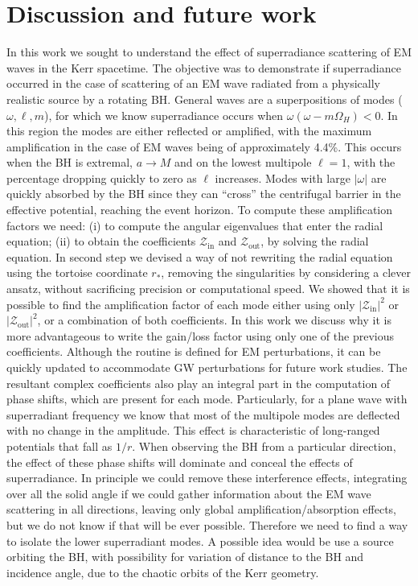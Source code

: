 
\chapter{Discussion and future work} %
\label{Chapter6}

In this work we sought to understand the effect of superradiance scattering of EM waves in the Kerr spacetime.
The objective was to demonstrate if superradiance occurred in the case of scattering of an EM wave radiated from a physically realistic source by a rotating BH.
General waves are a superpositions of modes ($\omega, \ell, m$), for which we know superradiance occurs when $\omega(\omega - m \Omega_H)<0$.
In this region the modes are either reflected or amplified, with the maximum amplification in the case of EM waves being of approximately 4.4\%.
This occurs when the BH is extremal, $a\to M$ and on the lowest multipole $\ell=1$, with the percentage dropping quickly to zero as $\ell$ increases.
Modes with large $|\omega|$ are quickly absorbed by the BH since they can ``cross'' the centrifugal barrier in the effective potential, reaching the event horizon.
To compute these amplification factors we need: (i) to compute the angular eigenvalues that enter the radial equation; (ii) to obtain the coefficients $\mathscr{Z}_\mathrm{in}$ and $\mathscr{Z}_\mathrm{out}$, by solving the radial equation.
In second step we devised a way of not rewriting the radial equation using the tortoise coordinate $r_*$, removing the singularities by considering a clever ansatz, without sacrificing precision or computational speed.
We showed that it is possible to find the amplification factor of each mode either using only $|\mathscr{Z}_\mathrm{in}|^2$ or $|\mathscr{Z}_\mathrm{out}|^2$, or a combination of both coefficients.
In this work we discuss why it is more advantageous to write the gain/loss factor using only one of the previous coefficients.
Although the routine is defined for EM perturbations, it can be quickly updated to accommodate GW perturbations for future work studies.
The resultant complex coefficients also play an integral part in the computation of phase shifts, which are present for each mode.
Particularly, for a plane wave with superradiant frequency we know that most of the multipole modes are deflected with no change in the amplitude.
This effect is characteristic of long-ranged potentials that fall as $1/r$.
When observing the BH from a particular direction, the effect of these phase shifts will dominate and conceal the effects of superradiance.
In principle we could remove these interference effects, integrating over all the solid angle if we could gather information about the EM wave scattering in all directions, leaving only global amplification/absorption effects, but we do not know if that will be ever possible.
Therefore we need to find a way to isolate the lower superradiant modes. A possible idea would be use a source orbiting the BH, with possibility for variation of distance to the BH and incidence angle, due to the chaotic orbits of the Kerr geometry.

